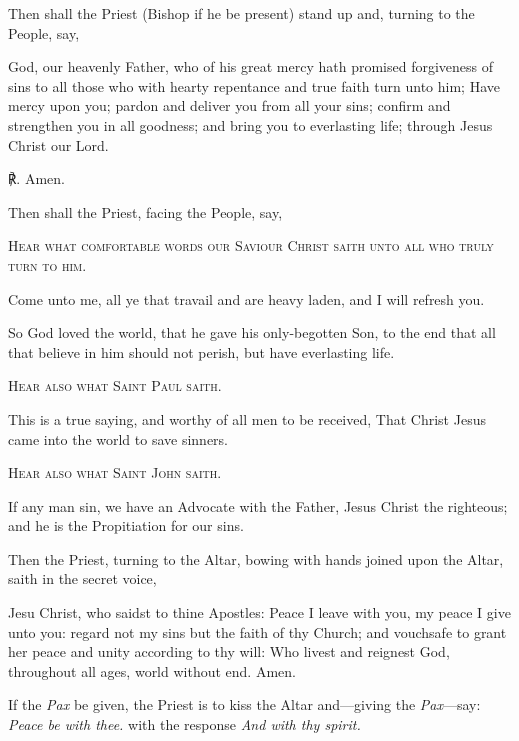 \begin{rubric}
	Then shall the Priest (Bishop if he be present) stand up and, turning to the People, say,
\end{rubric}
 God, our heavenly Father, who of his great mercy hath promised forgiveness of sins to all those who with hearty repentance and true faith turn unto him; Have mercy upon you; pardon {} and deliver you from all your sins; confirm and strengthen you in all goodness; and bring you to everlasting life; through Jesus Christ our Lord.

℟. Amen.
\begin{rubric}
Then shall the Priest, facing the People, say,
\end{rubric}\noindent
\begin{center}
	\textsc{Hear what comfortable words our Saviour Christ saith unto all who truly turn to him.}
\end{center}
\par\noindent
Come unto me, all ye that travail and are heavy laden, and I will refresh you. 
\par\noindent
    So God loved the world, that he gave his only-begotten Son, to the end that all that believe in him should not perish, but have everlasting life. 
    \par\noindent
    \begin{center}
		\textsc{Hear also what Saint Paul saith.}
	\end{center}
\par\noindent
    This is a true saying, and worthy of all men to be received, That Christ Jesus came into the world to save sinners. 
\clearpage
    \begin{center}
		\textsc{Hear also what Saint John saith.}
	\end{center}
    \par\noindent
    If any man sin, we have an Advocate with the Father, Jesus Christ the righteous; and he is the Propitiation for our sins. 
\begin{rubric}
    Then the Priest, turning to the Altar, bowing with hands joined upon the Altar, saith in the secret voice,
\end{rubric}
     Jesu Christ, who saidst to thine Apostles: Peace I leave with you, my peace I give unto you: regard not my sins but the faith of thy Church; and vouchsafe to grant her peace and unity according to thy will: Who livest and reignest God, throughout all ages, world without end. Amen.
\begin{rubric}
    If the \emph{Pax} be given, the Priest is to kiss the Altar and---giving the \emph{Pax}---say: \emph{Peace be with thee.} with the response \emph{And with thy spirit.}
\end{rubric}

